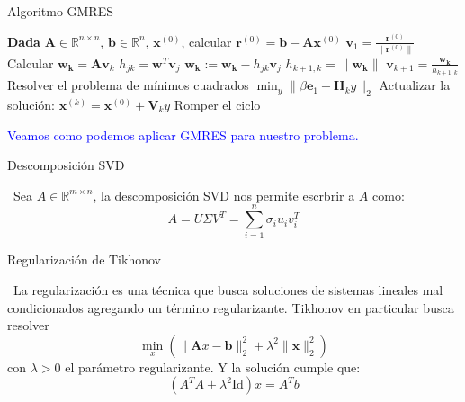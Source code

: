 \documentclass[12pt]{beamer}
\begin{document}
	\begin{frame}
		
		\begin{algorithm}[H]
			\caption{Algoritmo GMRES}
			\begin{algorithmic}[1]
				\State \textbf{Dada} $\mathbf{A} \in \mathbb{R}^{n \times n}$, $\mathbf{b} \in \mathbb{R}^n$, $\mathbf{x}^{(0)}$, calcular $\mathbf{r}^{(0)} = \mathbf{b} - \mathbf{A} \mathbf{x}^{(0)}$
				\State $\mathbf{v}_1 = \frac{\mathbf{r}^{(0)}}{\|\mathbf{r}^{(0)}\|}$
				\State Calcular $\mathbf{w_k} = \mathbf{A} \mathbf{v}_k$
				\State $h_{jk} = \mathbf{w}^T \mathbf{v}_j$
				\State $\mathbf{w_k} := \mathbf{w_k} - h_{jk} \mathbf{v}_j$
				\EndFor
				\State $h_{k+1,k} = \|\mathbf{w_k}\|$
				\State $\mathbf{v}_{k+1} = \frac{\mathbf{w_k}}{h_{k+1,k}}$
				\EndIf
				\EndFor
				\State Resolver el problema de mínimos cuadrados $\min_y \|\beta \mathbf{e}_1 - \mathbf{H}_k y\|_2$
				\State Actualizar la solución: $\mathbf{x}^{(k)} = \mathbf{x}^{(0)} + \mathbf{V}_k y$
				\State Romper el ciclo
				\EndIf
			\end{algorithmic}
		\end{algorithm}
		
	\end{frame}
	
	\begin{frame}
		
		\textcolor{blue}{\Large Veamos como podemos aplicar GMRES para nuestro problema.}
		
	\end{frame}
	
	\begin{frame}{Descomposición SVD}
		
		\ Sea $A \in \mathbb{R}^{m \times n}$, la descomposición SVD nos permite escrbrir a $A$ como: $$A = U \Sigma V^T = \sum_{i=1}^{n} \sigma_i u_i v_i^T$$
		
	\end{frame}
	
	
	\begin{frame}{Regularización de Tikhonov}
		
		\ La regularización es una técnica que busca soluciones de sistemas lineales mal condicionados agregando un término regularizante. Tikhonov en particular busca resolver $$\min_{x} \left( \| \mathbf{A}x - \mathbf{b} \|_2^2 + \lambda^2 \| \mathbf{x} \|_2^2 \right)$$ con $\lambda > 0$ el parámetro regularizante. Y la solución cumple que: \[ 
		\boxed{(A^TA + \lambda^2 \mathrm{Id})x = A^Tb}
		\]
		
	\end{frame}
	
\end{document}
